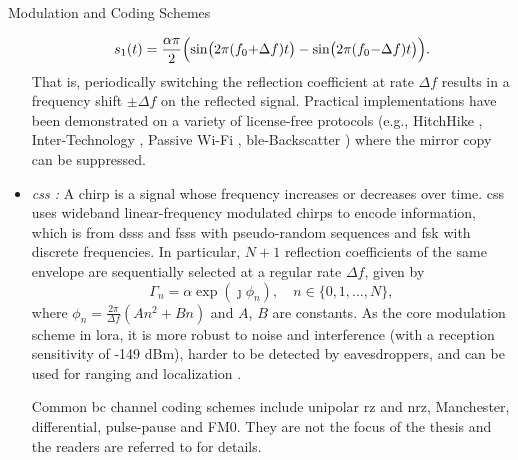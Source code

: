 \begin{section}{}
\begin{subsection}{Modulation and Coding Schemes}
\begin{itemize}
			\begin{equation}
				s_1(t) = \frac{\alpha \pi}{2} \Bigl(\sin\bigl(2 \pi (f_0 {+} \Delta f) t\bigr) - \sin\bigl(2 \pi (f_0 {-} \Delta f) t\bigr)\Bigr).
			\end{equation}
			That is, periodically switching the reflection coefficient at rate $\Delta f$ results in a frequency shift $\pm \Delta f$ on the reflected signal.
			Practical implementations have been demonstrated on a variety of license-free protocols (e.g., HitchHike \cite{Zhang2016a}, Inter-Technology \cite{Iyer2016}, Passive Wi-Fi \cite{Kellogg2017}, \gls{ble}-Backscatter \cite{Ensworth2017}) where the mirror copy can be suppressed.
			\item \emph{\gls{css} \cite{Talla2017}:} A chirp is a signal whose frequency increases or decreases over time.
			\gls{css} uses wideband linear-frequency modulated chirps to encode information, which is from \gls{dsss} and \gls{fsss} with pseudo-random sequences and \gls{fsk} with discrete frequencies.
			In particular, $N+1$ reflection coefficients of the same envelope are sequentially selected at a regular rate $\Delta f$, given by
			\begin{equation}
				\Gamma_n = \alpha \exp(\jmath \phi_n), \quad n \in \{0, 1, \ldots, N\},
			\end{equation}
			where $\phi_n = \frac{2 \pi}{\Delta f}(A n^2 + B n)$ and $A$, $B$ are constants.
			As the core modulation scheme in \gls{lora}, it is more robust to noise and interference (with a reception sensitivity of -149 dBm), harder to be detected by eavesdroppers, and can be used for ranging and localization \cite{Abbasi2021a}.

			Common \gls{bc} channel coding schemes include unipolar \gls{rz} and \gls{nrz}, Manchester, differential, pulse-pause and FM0.
			They are not the focus of the thesis and the readers are referred to \cite[Chapter 2.3]{Hoang2020} for details.
		\end{itemize}
	\end{subsection}


\end{section}
